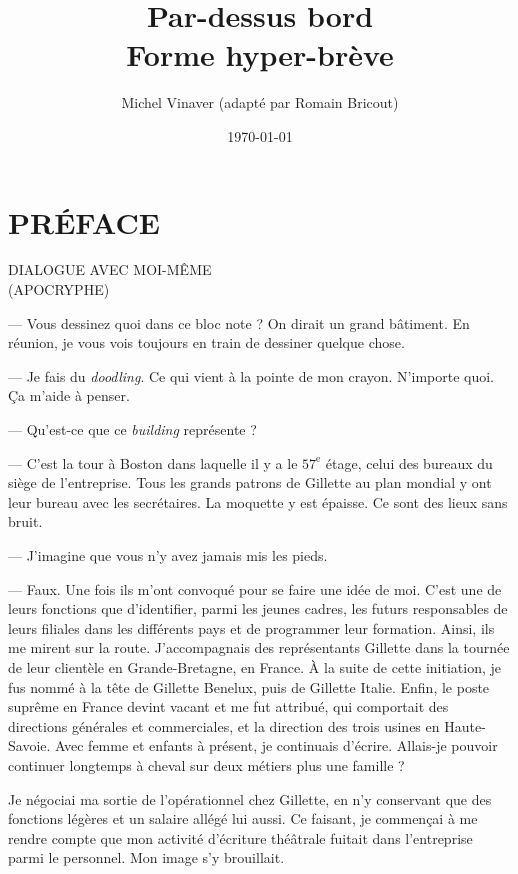 \documentclass[a4paper]{report}
\title{Par-dessus bord\\\large Forme hyper-brève}
\author{Michel Vinaver (adapté par Romain Bricout)}
\date{\today}
\begin{document}

\maketitle

\renewcommand{\contentsname}{Sommaire}
\dominitoc\tableofcontents

\chapter*{PRÉFACE}

\begin{center}
DIALOGUE AVEC MOI-MÊME\\(APOCRYPHE)
\end{center}

--- Vous dessinez quoi dans ce bloc note ? On dirait un grand bâtiment. En réunion, je vous vois toujours en train de dessiner quelque chose.

--- Je fais du \textit{doodling}. Ce qui vient à la pointe de mon crayon. N'importe quoi. Ça m'aide à penser.

--- Qu'est-ce que ce \textit{building} représente ?

--- C'est la tour à Boston dans laquelle il y a le \(57^{\text{e}}\) étage, celui des bureaux du siège de l'entreprise. Tous les grands patrons de Gillette au plan mondial y ont leur bureau avec les secrétaires. La moquette y est épaisse. Ce sont des lieux sans bruit.

--- J'imagine que vous n'y avez jamais mis les pieds.

--- Faux. Une fois ils m'ont convoqué pour se faire une idée de moi. C'est une de leurs fonctions que d'identifier, parmi les jeunes cadres, les futurs responsables de leurs filiales dans les différents pays et de programmer leur formation. Ainsi, ils me mirent sur la route. J'accompagnais des représentants Gillette dans la tournée de leur clientèle en Grande-Bretagne, en France. À la suite de cette initiation, je fus nommé à la tête de Gillette Benelux, puis de Gillette Italie. Enfin, le poste suprême en France devint vacant et me fut attribué, qui comportait des directions générales et commerciales, et la direction des trois usines en Haute-Savoie. Avec femme et enfants à présent, je continuais d'écrire. Allais-je pouvoir continuer longtemps à cheval sur deux métiers plus une famille ?

Je négociai ma sortie de l'opérationnel chez Gillette, en n'y conservant que des fonctions légères et un salaire allégé lui aussi. Ce faisant, je commençai à me rendre compte que mon activité d'écriture théâtrale fuitait dans l'entreprise parmi le personnel. Mon image s'y brouillait.
\end{document}
